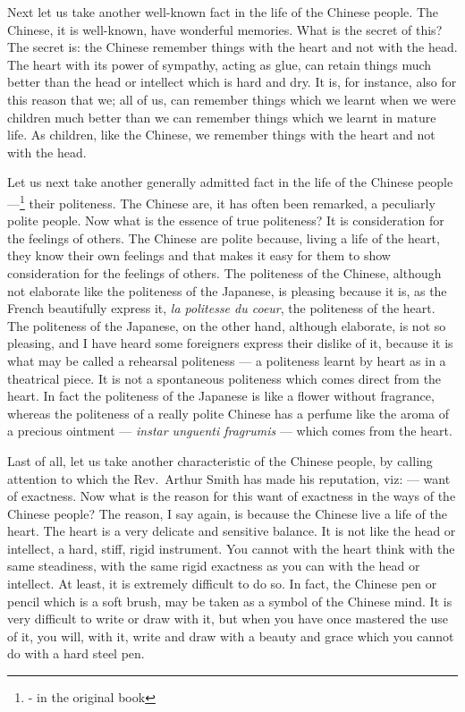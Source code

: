 Next let us take another well-known fact in the life of the Chinese people.
The Chinese, it is well-known, have wonderful memories.
What is the secret of this?
The secret is: the Chinese remember things with the heart and not with the head.
The heart with its power of sympathy, acting as glue, can retain things much better than the head or intellect which is hard and dry.
It is, for instance, also for this reason that we; \marginpar{\scriptsize ; [sic: ,]} all of us, can remember things which we learnt when we were children much better than we can remember things which we learnt in mature life.
As children, like the Chinese, we remember things with the heart and not with the head.

Let us next take another generally admitted fact in the life of the Chinese people ---\footnote{- in the original book} their politeness.
The Chinese are, it has often been remarked, a peculiarly polite people.
Now what is the essence of true politeness?
It is consideration for the feelings of others.
The Chinese are polite because, living a life of the heart, they know their own feelings and that makes it easy for them to show consideration for the feelings of others.
The politeness of the Chinese, although not elaborate like the politeness of the Japanese, is pleasing because it is, as the French beautifully express it, \emph{la politesse du coeur}, the politeness of the heart.
The politeness of the Japanese, on the other hand, although elaborate, is not so pleasing, and I have heard some foreigners express their dislike of it, because it is what may be called a rehearsal politeness --- a politeness learnt by heart as in a theatrical piece.
It is not a spontaneous politeness which comes direct from the heart.
In fact the politeness of the Japanese is like a flower without fragrance, whereas the politeness of a really polite Chinese has a perfume like the aroma of a precious ointment --- \emph{instar unguenti fragrumis}  --- which comes from the heart.

Last of all, let us take another characteristic of the Chinese people, by calling attention to which the Rev.~Arthur Smith  has made his reputation, viz: --- want of exactness.
Now what is the reason for this want of exactness in the ways of the Chinese people?
The reason, I say again, is because the Chinese live a life of the heart.
The heart is a very delicate and sensitive balance.
It is not like the head or intellect, a hard, stiff, rigid instrument.
You cannot with the heart think with the same steadiness, with the same rigid exactness as you can with the head or intellect.
At least, it is extremely difficult to do so.
In fact, the Chinese pen or pencil which is a soft brush, may be taken as a symbol of the Chinese mind.
It is very difficult to write or draw with it, but when you have once mastered the use of it, you will, with it, write and draw with a beauty and grace which you cannot do with a hard steel pen.

